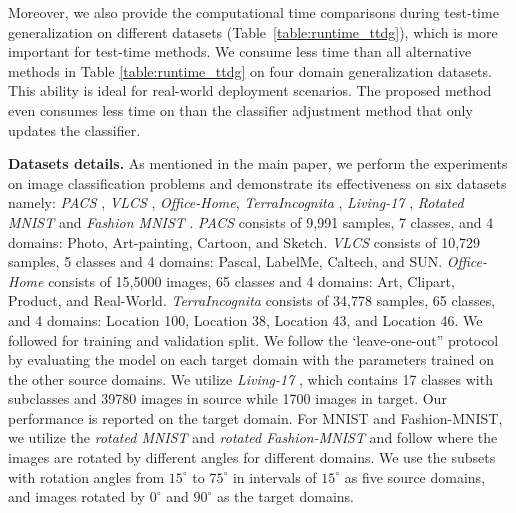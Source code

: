 Moreover, we also provide the computational time comparisons during test-time generalization on different datasets (Table~\ref{table:runtime_ttdg}), which is more important for test-time methods. 
We consume less time than all alternative methods in Table \ref{table:runtime_ttdg} on four domain generalization datasets. This ability is ideal for real-world deployment scenarios. The proposed method even consumes less time on than the classifier adjustment method \cite{iwasawa2021test} that only updates the classifier.

\noindent\textbf{Datasets details. } As mentioned in the main paper, we perform the experiments on image classification problems and demonstrate its effectiveness on six datasets namely: \textit{PACS} \cite{li2017deeper}, \textit{VLCS} \cite{fang2013video}, \textit{Office-Home}\cite{venkateswara2017deep}, \textit{TerraIncognita} \cite{beery2018recognition}, \textit{Living-17} \cite{santurkar2020breeds}, \textit{Rotated MNIST} and \textit{Fashion MNIST} \cite{piratla2020efficient}. 
\textit{PACS} \cite{li2017deeper} consists of 9,991 samples, 7 classes, and 4 domains: Photo, Art-painting, Cartoon, and Sketch. 
\textit{VLCS} \cite{fang2013video} consists of 10,729 samples, 5 classes and 4 domains: Pascal, LabelMe, Caltech, and SUN. 
\textit{Office-Home} \cite{venkateswara2017deep} consists of 15,5000 images, 65 classes and 4 domains: Art, Clipart, Product, and Real-World. 
\textit{TerraIncognita} \cite{beery2018recognition} consists of 34,778 samples, 65 classes, and 4 domains:  Location 100, Location 38, Location 43, and Location 46. We followed \cite{li2017deeper} for training and validation split. 
We follow the ‘leave-one-out” protocol \cite{li2017deeper,carlucci2019domain} by evaluating the model on each target domain with the parameters trained on the other source domains. 
We utilize \textit{Living-17} \cite{santurkar2020breeds}, which contains 17 classes with subclasses and 39780 images in source while 1700 images in target. Our performance is reported on the target domain.
For MNIST and Fashion-MNIST, we utilize the \textit{rotated MNIST} and \textit{rotated Fashion-MNIST} and follow \cite{piratla2020efficient} where the images are rotated by different angles for different domains. 
We use the subsets with rotation angles from $15^\circ$ to $75^\circ$ in intervals of $15^\circ$ as five source domains, and images rotated by $0^\circ$ and $90^\circ$ as the target domains.






